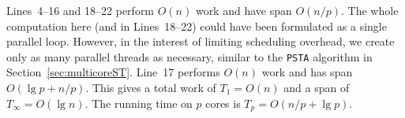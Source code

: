 Lines~4--16 and 18--22 perform $O(n)$ work and have span $O(n/p)$.
The whole computation here (and in Lines~18--22) could have been formulated as a
single parallel loop.
However, in the interest of limiting scheduling overhead, we create only as many
parallel threads as necessary, similar to the {\tt PSTA} algorithm in
Section~\ref{sec:multicoreST}.
Line~17 performs $O(n)$ work and has span $O(\lg p + n/p)$.
This gives a total work of $T_1 = O(n)$ and a span of $T_\infty = O(\lg n)$.
The running time on $p$ cores is $T_p = O(n/p + \lg p)$.
